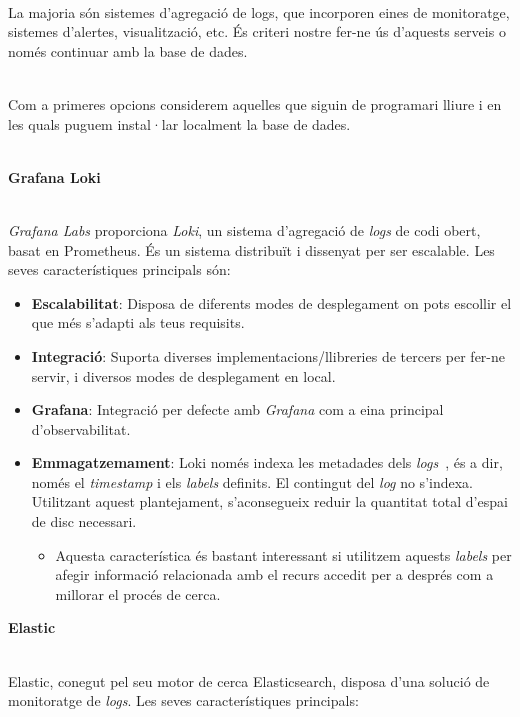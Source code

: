 \noindent \\
La majoria són sistemes d’agregació de logs, que incorporen eines de monitoratge, sistemes d’alertes, visualització, etc.
És criteri nostre fer-ne ús d’aquests serveis o només continuar amb la base de dades.

\noindent \\
Com a primeres opcions considerem aquelles que siguin de programari lliure i en les quals puguem instal·lar localment la base de dades.

\noindent \\
\textbf{Grafana Loki~\cite{loki:main}}\label{subsubsec:log-db-option-loki}

\noindent \\
\textit{Grafana Labs} proporciona \textit{Loki}, un sistema d’agregació de \textit{\gls{log}s} de codi obert, basat en Prometheus.
És un sistema distribuït i dissenyat per ser escalable.
Les seves característiques principals són:

\begin{itemize}
    \item \textbf{Escalabilitat}: Disposa de diferents modes de desplegament on pots escollir el que més s’adapti als teus requisits.
    \item \textbf{Integració}: Suporta diverses implementacions/llibreries de tercers per fer-ne servir, i diversos modes de desplegament en local.
    \item \textbf{Grafana}: Integració per defecte amb \textit{Grafana} com a eina principal d’observabilitat.
    \item \textbf{Emmagatzemament}: Loki només indexa les metadades dels \textit{\gls{log}s}~\cite{loki:indexing}, és a dir, només el \textit{\gls{timestamp}} i els \textit{labels} definits.
    El contingut del \textit{\gls{log}} no s’indexa.
    Utilitzant aquest plantejament, s’aconsegueix reduir la quantitat total d'espai de disc necessari.
    \begin{itemize}
        \item Aquesta característica és bastant interessant si utilitzem aquests \textit{labels} per afegir informació relacionada amb el recurs accedit per a després com a millorar el procés de cerca.
    \end{itemize}
\end{itemize}

\clearpage

\noindent
\textbf{Elastic~\cite{elastic}}

\noindent \\
Elastic, conegut pel seu motor de cerca Elasticsearch, disposa d’una solució de monitoratge de \textit{\gls{log}s}.
Les seves característiques principals:

